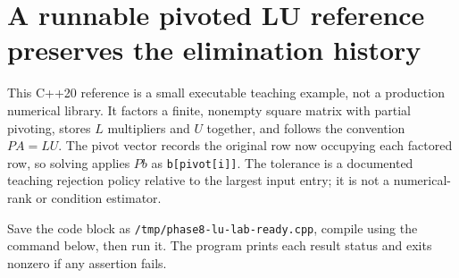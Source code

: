 \section{A runnable pivoted LU reference preserves the elimination history}\label{01-foundations-i-ch019-a-runnable-pivoted-lu-reference-preserves-the-elimination-history}

This C++20 reference is a small executable teaching example, not a production numerical library. It factors a finite, nonempty square matrix with partial pivoting, stores \(L\) multipliers and \(U\) together, and follows the convention \(PA=LU\). The pivot vector records the original row now occupying each factored row, so solving applies \(Pb\) as \texttt{b{[}pivot{[}i{]}{]}}. The tolerance is a documented teaching rejection policy relative to the largest input entry; it is not a numerical-rank or condition estimator.

Save the code block as \texttt{/tmp/phase8-lu-lab-ready.cpp}, compile using the command below, then run it. The program prints each result status and exits nonzero if any assertion fails.


